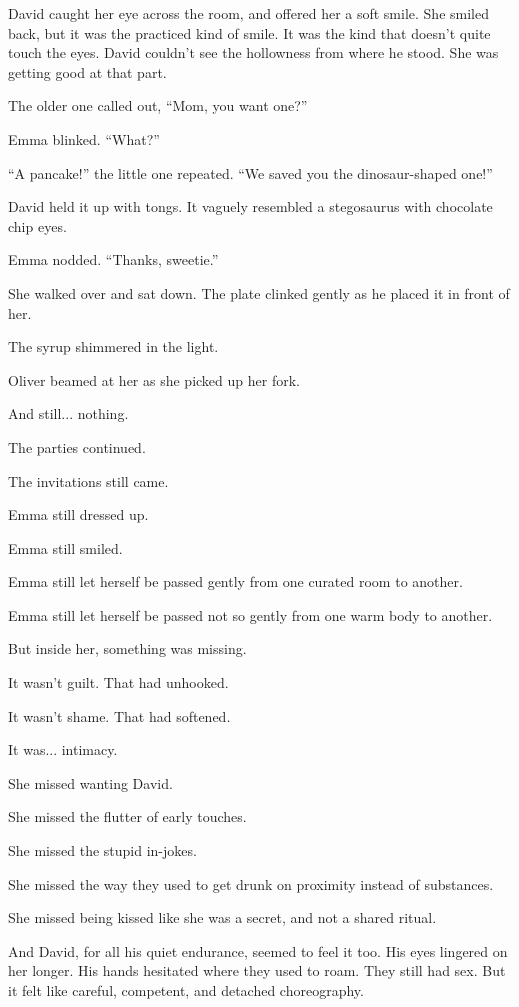 David caught her eye across the room, and offered her a soft smile. She smiled back, but it was the practiced 
kind of smile. It was the kind that doesn’t quite touch the eyes. David couldn’t see the hollowness from where 
he stood. She was getting good at that part.

The older one called out, ``Mom, you want one?''

Emma blinked. ``What?''

``A pancake!'' the little one repeated. ``We saved you the dinosaur-shaped one!''

David held it up with tongs. It vaguely resembled a stegosaurus with chocolate chip eyes.

Emma nodded. ``Thanks, sweetie.''

She walked over and sat down. The plate clinked gently as he placed it in front of her.

The syrup shimmered in the light.

Oliver beamed at her as she picked up her fork.

And still... nothing.

The parties continued.

The invitations still came. 

Emma still dressed up. 

Emma still smiled. 

Emma still let herself be passed gently from one curated room to another.

Emma still let herself be passed not so gently from one warm body to another. 

But inside her, something was missing.

It wasn’t guilt. That had unhooked.

It wasn’t shame. That had softened.

It was... intimacy.

She missed wanting David. 

She missed the flutter of early touches. 

She missed the stupid in-jokes.

She missed the way they used to get drunk on proximity instead of substances. 

She missed being kissed like she was a secret, and not a shared ritual.

And David, for all his quiet endurance, seemed to feel it too. His eyes lingered on her longer. 
His hands hesitated where they used to roam. They still had sex. But it felt like careful,
competent, and detached choreography. 

